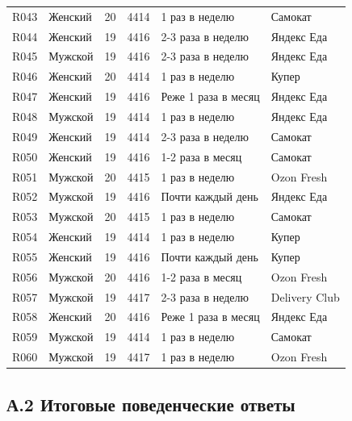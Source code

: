 {\begin{longtable}{L{1.05cm}L{2.2cm}R{1.35cm}R{1.35cm}L{4.2cm}L{4.0cm}}
R043 & Женский & 20 & 4414 & 1 раз в неделю & Самокат \\
R044 & Женский & 19 & 4416 & 2-3 раза в неделю & Яндекс Еда \\
R045 & Мужской & 19 & 4416 & 2-3 раза в неделю & Яндекс Еда \\
R046 & Женский & 20 & 4414 & 1 раз в неделю & Купер \\
R047 & Женский & 19 & 4416 & Реже 1 раза в месяц & Яндекс Еда \\
R048 & Мужской & 19 & 4414 & 1 раз в неделю & Яндекс Еда \\
R049 & Женский & 19 & 4414 & 2-3 раза в неделю & Самокат \\
R050 & Женский & 19 & 4416 & 1-2 раза в месяц & Самокат \\
R051 & Мужской & 20 & 4415 & 1 раз в неделю & Ozon Fresh \\
R052 & Мужской & 19 & 4416 & Почти каждый день & Яндекс Еда \\
R053 & Мужской & 20 & 4415 & 1 раз в неделю & Самокат \\
R054 & Женский & 19 & 4414 & 1 раз в неделю & Купер \\
R055 & Женский & 19 & 4416 & Почти каждый день & Купер \\
R056 & Мужской & 20 & 4416 & 1-2 раза в месяц & Ozon Fresh \\
R057 & Мужской & 19 & 4417 & 2-3 раза в неделю & Delivery Club \\
R058 & Женский & 20 & 4416 & Реже 1 раза в месяц & Яндекс Еда \\
R059 & Мужской & 19 & 4414 & 1 раз в неделю & Самокат \\
R060 & Мужской & 19 & 4417 & 1 раз в неделю & Ozon Fresh \\
\end{longtable}
}

\subsection*{А.2 Итоговые поведенческие ответы}

